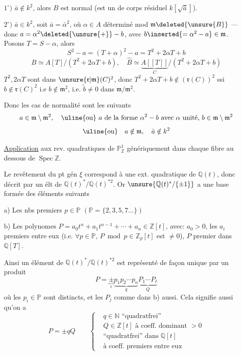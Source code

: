 $1^\circ)$ $\bar a\notin k^2$, alors $B$ est normal (est un  de
corps résiduel $k[\sqrt{\bar a}]$).

$2^\circ)$ $\bar a\in k^2$, soit $\bar a=\bar\alpha^2$, où $\alpha\in A$ déterminé mod
$\mathfrak m\deleted{\unsure{B}}$ --- donc
$a=\alpha^2\deleted{\unsure{+}}-b$, avec $b\inserted{={}\alpha^2-a}\in\mathfrak m$.
Posons $T=S-\alpha$, alors
\[
S^2-a=(T+\alpha)^2-a=T^2+2\alpha T+b
\]
\[
B\simeq A[T]/(T^2+2\alpha T+b),\quad
\widehat B\simeq\underbrace{A[[T]]}_{C}/(T^2+2\alpha T+b)
\]
$T^2,2\alpha T$ sont dans $\unsure{\mathfrak r|\mathfrak m}(C)^2$, donc
$T^2+2\alpha T+b\notin(\mathfrak r(C))^2$
ssi $b\notin\mathfrak r(C)^2$ i.e $b\notin\mathfrak m^2$, i.e.
$\widetilde b\ne0$ dans $\mathfrak m/\mathfrak m^2$.

Donc les cas de normalité sont les suivants
\[
a\in\mathfrak m\setminus\mathfrak m^2,\quad
\text{\uline{ou} $a$ de la forme $\alpha^2-b$ avec $\alpha$ unité, $b\in\mathfrak m\setminus\mathfrak m^2$}
\]
\[
\text{\uline{ou}}\quad a\notin\mathfrak m,\quad\bar a\notin k^2
\]

\uline{Application} aux rev. quadratiques de $\mathbb P^1_{\mathbb Z}$
génériquement 
dans chaque fibre au dessous de $\operatorname{Spec}\mathbb Z$.

Le revêtement  
 du pt gén $\xi$ correspond à une ext.
quadratique de $\mathbb Q(t)$, donc décrit par un élt de
$\mathbb Q(t)^*/\mathbb Q(t)^{*2}$.
Or $\unsure{\mathbb Q(t)^*/\{\pm1\}}$ a une base formée des éléments suivants

a) Les nbs premiers $p\in\mathbb P$\quad
$(\mathbb P=\{2,3,5,7\ldots\})$

b) Les polynomes $P=a_0t^n+a_1t^{n-1}+\cdots+a_n\in\mathbb Z[t]$, avec:
$a_0>0$,  les $a_i$ premiers entre eux
(i.e. $\forall p\in\mathbb P$, $P\bmod p\in\mathbb Z_p[t]$ est $\ne0$),
$P$ premier dans $\mathbb Q[T]$.

Ainsi un élément de $\mathbb Q(t)^*/\mathbb Q(t)^{*2}$ est représenté de façon
unique par un produit
\[
P=\underbrace{\pm}_{\varepsilon}
\underbrace{p_1p_2\cdots p_n}_{q}
\underbrace{P_1\cdots P_\ell}_{Q}
\tag{1}
\]
où les $p_i\in\mathbb P$ sont distincts, et les $P_j$ comme dans b) aussi.
Cela signifie aussi qu'on a
\[
P=\pm qQ\qquad
\left\{
\begin{aligned}
&q\in\mathbb N\text{ ``quadratfrei''}\\
&Q\in\mathbb Z[t]\text{ à coeff. dominant }>0\\
&\text{``quadratfrei'' dans $\mathbb Q[t]$}\\
&\text{à coeff. premiers entre eux}
\end{aligned}
\right.
\]


